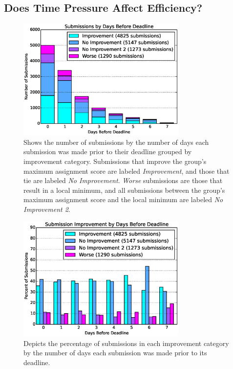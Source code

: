 \subsection{Does Time Pressure Affect Efficiency?}

\begin{figure}[!t]
\centering \includegraphics[width=3.3in]{graphs/Submissions_by_Days_Before_Deadline.eps}
\caption{Shows the number of submissions by the number of days each submission
  was made prior to their deadline grouped by improvement category.
  Submissions that improve the group's maximum assignment score are labeled
  \emph{Improvement}, and those that tie are labeled \emph{No
    Improvement}. \emph{Worse} submissions are those that result in a local
  minimum, and all submissions between the group's maximum assignment score and
  the local minimum are labeled \emph{No Improvement 2}.}
\end{figure}

\begin{figure}[!t]
\centering
\includegraphics[width=3.3in]{graphs/Submission_Improvement_by_Days_Before_Deadline.eps}
\caption{Depicts the percentage of submissions in each improvement category by
  the number of days each submission was made prior to its deadline.}
\end{figure}

